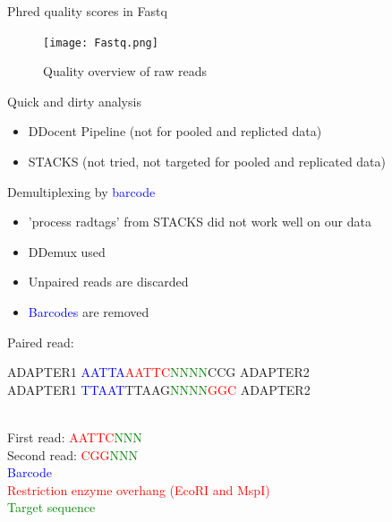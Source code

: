 \documentclass[presentation]{beamer}
\begin{document}
\begin{frame}[label=sec-5]{Phred quality scores in Fastq}
\begin{figure}[htb]
\centering
\texttt{[image: Fastq.png]}
\caption{Quality overview of raw reads}
\end{figure}
\end{frame}


\begin{frame}[label=sec-6]{Quick and dirty analysis}
\begin{itemize}
\item DDocent Pipeline (not for pooled and replicted data)
\item STACKS (not tried, not targeted for pooled and replicated data)
\end{itemize}
\end{frame}

\begin{frame}[label=sec-7]{Demultiplexing by \textcolor{blue}{barcode}}
\begin{itemize}
\item 'process radtags' from STACKS did not work well on our data
\item DDemux used
\item Unpaired reads are discarded
\item \textcolor{blue}{Barcodes} are removed
\end{itemize}


\begin{latex:}
\footnotesize
Paired read:\\
\begin{center}
ADAPTER1 \textcolor{blue}{AATTA}\textcolor{red}{AATTC}\textcolor{green}{NNNN}CCG ADAPTER2\\
ADAPTER1 \textcolor{blue}{TTAAT}TTAAG\textcolor{green}{NNNN}\textcolor{red}{GGC} ADAPTER2
\end{center}\\
First read: \hphantom{A} \textcolor{red}{AATTC}\textcolor{green}{NNN}\\
Second read: \textcolor{red}{CGG}\textcolor{green}{NNN}\\
\vspace{0.5cm}
\textcolor{blue}{Barcode}\\
\textcolor{red}{Restriction enzyme overhang (EcoRI and MspI)}\\
\textcolor{green}{Target sequence}\\
\end{latex:}
\end{frame}
\end{document}
